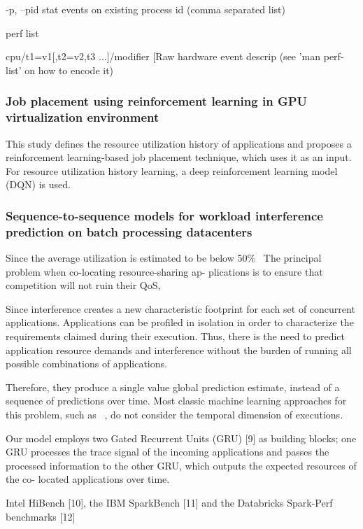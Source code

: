\documentclass[UTF8]{article}
\begin{document}
-p, --pid stat events on existing process id (comma separated list)

perf list

cpu/t1=v1[,t2=v2,t3 ...]/modifier                  [Raw hardware event descrip
(see 'man perf-list' on how to encode it)

\subsubsection{Job placement using reinforcement learning in GPU virtualization environment}

 This study defines the resource utilization history of applications and proposes a reinforcement learning-based job placement technique, which uses it as an input. For resource utilization history learning, a deep reinforcement learning model (DQN) is used.
 
 
\subsubsection{Sequence-to-sequence models for workload interference prediction on batch processing datacenters}

Since the average utilization is estimated to be below 50\%~\cite{barroso2007case, reiss2012heterogeneity} The principal problem when co-locating resource-sharing ap- plications is to ensure that competition will not ruin their QoS,

Since interference creates a new characteristic footprint for each set of concurrent applications. Applications can be profiled in isolation in order to characterize the requirements claimed during their execution. Thus, there is the need to predict application resource demands and interference without the burden of running all possible combinations of applications.

Therefore, they produce a single value global prediction estimate, instead of a sequence of predictions over time. Most classic machine learning approaches for this problem, such as ~\cite{mishra2017esp, delimitrou2013paragon}, do not consider the temporal dimension of executions.

Our model employs two Gated Recurrent Units (GRU) [9] as building blocks; one GRU processes the trace signal of the incoming applications and passes the processed information to the other GRU, which outputs the expected resources of the co- located applications over time.

Intel HiBench [10], the IBM SparkBench [11] and the Databricks Spark-Perf benchmarks [12]
\end{document}
